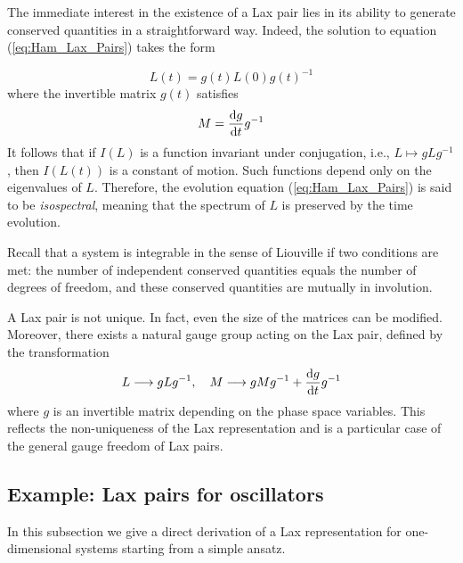 The immediate interest in the existence of a Lax pair lies in its ability to generate conserved quantities in a straightforward way. Indeed, the solution to equation (\ref{eq:Ham_Lax_Pairs}) takes the form

\begin{equation}
    L(t) = g(t) L(0) g(t)^{-1}
\end{equation}
where the invertible matrix $g(t)$ satisfies
\begin{equation}
    M = \dv{g}{t} g^{-1}
\end{equation}
It follows that if $I(L)$ is a function invariant under conjugation, i.e., $L \mapsto gLg^{-1}$, then $I(L(t))$ is a constant of motion.
Such functions depend only on the eigenvalues of $L$. 
Therefore, the evolution equation (\ref{eq:Ham_Lax_Pairs}) is said to be \emph{isospectral}, meaning that the spectrum of $L$ is preserved by the time evolution.

\begin{remark}
    Recall that a system is integrable in the sense of Liouville if two conditions are met: the number of independent conserved quantities equals the number of degrees of freedom, and these conserved quantities are mutually in involution.
\end{remark}
\begin{remark}
    A Lax pair is not unique. In fact, even the size of the matrices can be modified. Moreover, there exists a natural gauge group acting on the Lax pair, defined by the transformation
    \begin{equation}
        L \longrightarrow gLg^{-1}, \quad M \longrightarrow gMg^{-1} + \dv{g}{t}g^{-1}
    \end{equation}
    where $g$ is an invertible matrix depending on the phase space variables.  
    This reflects the non-uniqueness of the Lax representation and is a particular case of the general gauge freedom of Lax pairs.
\end{remark}

\subsection{Example: Lax pairs for oscillators} \label{subsec:Example: Lax pairs for oscillators}
In this subsection we give a direct derivation of a Lax representation for one-dimensional systems starting from a simple ansatz.

